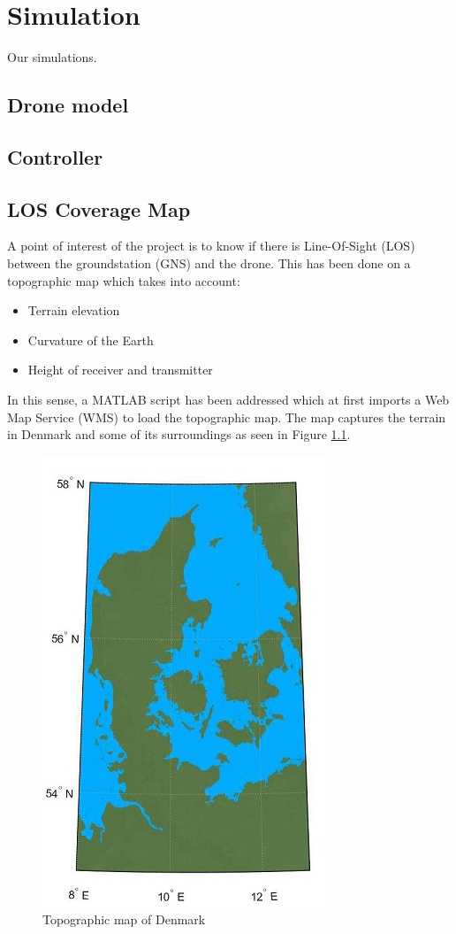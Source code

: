 \chapter{Simulation}\label{ch:simulation}
Our simulations.

\section{Drone model}

\section{Controller}

\section{LOS Coverage Map}

A point of interest of the project is to know if there is Line-Of-Sight (LOS) between the groundstation (GNS) and the drone. This has been done on a topographic map which takes into account:

\begin{itemize}
	\item Terrain elevation
	\item Curvature of the Earth
	\item Height of receiver and transmitter
\end{itemize}

In this sense, a MATLAB script has been addressed which at first imports a Web Map Service (WMS) to load the topographic map. The map captures the terrain in Denmark and some of its surroundings as seen in Figure \ref{fig:dk_map}.

\begin{figure}[h]
	\centering
	\includegraphics[scale=2]{figures/denmark.jpg}
	\caption{Topographic map of Denmark}
   	\label{fig:dk_map}
\end{figure}

